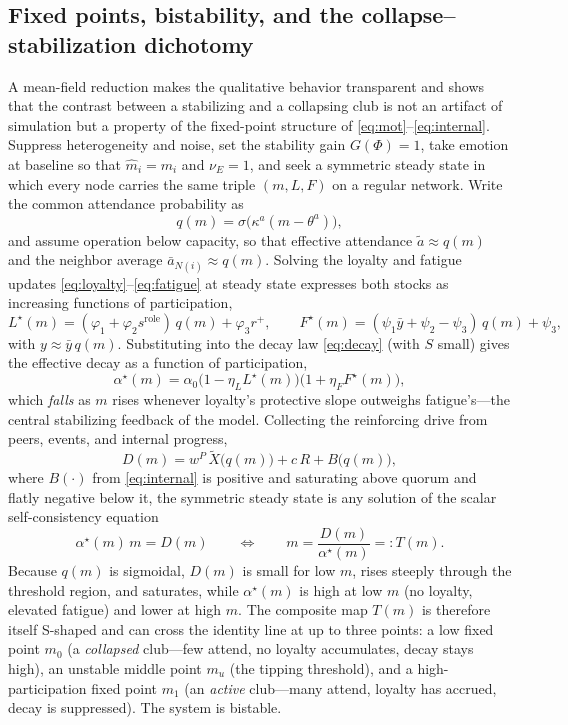 \documentclass[11pt]{article}
\begin{document}
\subsection{Fixed points, bistability, and the collapse--stabilization dichotomy}\label{sec:fixedpoints}
A mean-field reduction makes the qualitative behavior transparent and shows that the contrast between a stabilizing and a collapsing club is not an artifact of simulation but a property of the fixed-point structure of \eqref{eq:mot}--\eqref{eq:internal}. Suppress heterogeneity and noise, set the stability gain $G(\Phi)=1$, take emotion at baseline so that $\hat m_i=m_i$ and $\nu_E=1$, and seek a symmetric steady state in which every node carries the same triple $(m,L,F)$ on a regular network. Write the common attendance probability as
\[
q(m)=\sigma\!\big(\kappa^a(m-\theta^a)\big),
\]
and assume operation below capacity, so that effective attendance $\tilde a\approx q(m)$ and the neighbor average $\bar a_{N(i)}\approx q(m)$. Solving the loyalty and fatigue updates \eqref{eq:loyalty}--\eqref{eq:fatigue} at steady state expresses both stocks as increasing functions of participation,
\[
L^\star(m)=(\varphi_1+\varphi_2 s^{\mathrm{role}})\,q(m)+\varphi_3 r^+,
\qquad
F^\star(m)=(\psi_1\bar y+\psi_2-\psi_3)\,q(m)+\psi_3,
\]
with $y\approx\bar y\,q(m)$. Substituting into the decay law \eqref{eq:decay} (with $S$ small) gives the effective decay as a function of participation,
\[
\alpha^\star(m)=\alpha_{0}\big(1-\eta_L L^\star(m)\big)\big(1+\eta_F F^\star(m)\big),
\]
which \emph{falls} as $m$ rises whenever loyalty's protective slope outweighs fatigue's---the central stabilizing feedback of the model. Collecting the reinforcing drive from peers, events, and internal progress,
\[
D(m)=w^{P}\,\tilde X\big(q(m)\big)+c\,R+B\big(q(m)\big),
\]
where $B(\cdot)$ from \eqref{eq:internal} is positive and saturating above quorum and flatly negative below it, the symmetric steady state is any solution of the scalar self-consistency equation
\begin{equation}\tag{$\star$}\label{eq:selfconsist}
\alpha^\star(m)\,m=D(m)
\qquad\Longleftrightarrow\qquad
m=\frac{D(m)}{\alpha^\star(m)}=:T(m).
\end{equation}
Because $q(m)$ is sigmoidal, $D(m)$ is small for low $m$, rises steeply through the threshold region, and saturates, while $\alpha^\star(m)$ is high at low $m$ (no loyalty, elevated fatigue) and lower at high $m$. The composite map $T(m)$ is therefore itself S-shaped and can cross the identity line at up to three points: a low fixed point $m_0$ (a \emph{collapsed} club---few attend, no loyalty accumulates, decay stays high), an unstable middle point $m_u$ (the tipping threshold), and a high-participation fixed point $m_1$ (an \emph{active} club---many attend, loyalty has accrued, decay is suppressed). The system is bistable.
\end{document}
